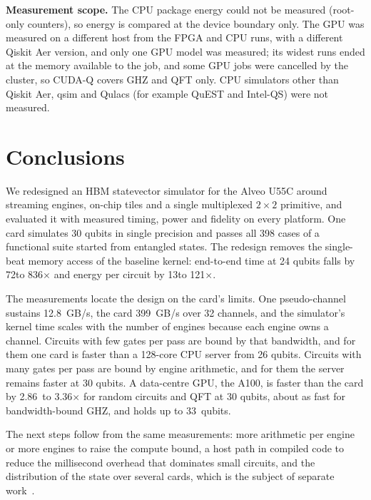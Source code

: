\documentclass[pdflatex,sn-mathphys-num]{sn-jnl}
\newcommand{\NumEnergyVsevenRatioMax}{121}
\newcommand{\NumEnergyVsevenRatioMin}{13}
\newcommand{\NumGpuCudaqSingleMaxN}{33}
\newcommand{\NumHbmSixteenPerCURead}{12.8}
\newcommand{\NumHbmThirtytwoCopy}{399}
\newcommand{\NumSpeedupVsevenMax}{836}
\newcommand{\NumSpeedupVsevenMin}{72}
\newcommand{\NumSuiteTotal}{398}
\newcommand{\NumXplatBestGpuRatioQftThirty}{3.36}
\newcommand{\NumXplatBestGpuRatioRqcThirty}{2.86}
\newcommand{\NumXplatGhzCrossN}{26}
\theoremstyle{thmstyleone}
\theoremstyle{thmstylethree}
\begin{document}
\textbf{Measurement scope.} The CPU package energy could not be measured (root-only counters), so energy is compared at the device boundary only. The GPU was measured on a different host from the FPGA and CPU runs, with a different Qiskit Aer version, and only one GPU model was measured; its widest runs ended at the memory available to the job, and some GPU jobs were cancelled by the cluster, so CUDA-Q covers GHZ and QFT only. CPU simulators other than Qiskit Aer, qsim and Qulacs (for example QuEST and Intel-QS) were not measured.
\section{Conclusions}\label{sec:conclusions}

We redesigned an HBM statevector simulator for the Alveo U55C around streaming engines, on-chip tiles and a single multiplexed $2\times2$ primitive, and evaluated it with measured timing, power and fidelity on every platform. One card simulates 30 qubits in single precision and passes all \NumSuiteTotal{} cases of a functional suite started from entangled states. The redesign removes the single-beat memory access of the baseline kernel: end-to-end time at 24 qubits falls by \NumSpeedupVsevenMin to \NumSpeedupVsevenMax$\times$ and energy per circuit by \NumEnergyVsevenRatioMin to \NumEnergyVsevenRatioMax$\times$.

The measurements locate the design on the card's limits. One pseudo-channel sustains \NumHbmSixteenPerCURead~GB/s, the card \NumHbmThirtytwoCopy~GB/s over 32 channels, and the simulator's kernel time scales with the number of engines because each engine owns a channel. Circuits with few gates per pass are bound by that bandwidth, and for them one card is faster than a 128-core CPU server from \NumXplatGhzCrossN{} qubits. Circuits with many gates per pass are bound by engine arithmetic, and for them the server remains faster at 30 qubits. A data-centre GPU, the A100, is faster than the card by \NumXplatBestGpuRatioRqcThirty~to \NumXplatBestGpuRatioQftThirty$\times$ for random circuits and QFT at 30 qubits, about as fast for bandwidth-bound GHZ, and holds up to \NumGpuCudaqSingleMaxN~qubits.

The next steps follow from the same measurements: more arithmetic per engine or more engines to raise the compute bound, a host path in compiled code to reduce the millisecond overhead that dominates small circuits, and the distribution of the state over several cards, which is the subject of separate work~\cite{ali2026multifpga}.
\end{document}
